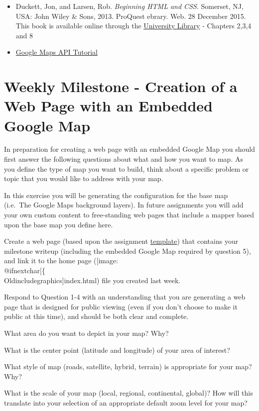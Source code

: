 \documentclass[]{book}
\makeatletter
\providecommand{\tightlist}{%
  \setlength{\itemsep}{0pt}\setlength{\parskip}{0pt}}
\def\ScaleIfNeeded{%
  \ifdim\Gin@nat@width>.5\linewidth
    .5\linewidth
  \else
    \Gin@nat@width
  \fi
}
\let\Oldincludegraphics\texttt{[image: \%
 \\catcode`\\@=11\\relax\%
 \%\\gdef\\includegraphics\{\\@ifnextchar[\{\\Oldincludegraphics]}{\Oldincludegraphics[width=\ScaleIfNeeded]}}%
\gdef\texttt{[image: \\@ifnextchar[\{\\Oldincludegraphics]}{\Oldincludegraphics[max size={.75\textwidth}{.75\textheight}]}}%
\makeatother
\begin{document}
\begin{itemize}
\item
  Duckett, Jon, and Larsen, Rob. \emph{Beginning HTML and CSS}.
  Somerset, NJ, USA: John Wiley \& Sons, 2013. ProQuest ebrary. Web. 28
  December 2015. This book is available online through the
  \href{http://site.ebrary.com.libproxy.unm.edu/lib/unma/detail.action?docID=10667426}{University
  Library} - Chapters 2,3,4 and 8
\item
  \href{http://code.google.com/apis/maps/documentation/javascript/tutorial.html}{Google
  Maps API Tutorial}
\end{itemize}

\section{Weekly Milestone - Creation of a Web Page with an Embedded
Google Map}\label{week03-milestone}

In preparation for creating a web page with an embedded Google Map you
should first answer the following questions about what and how you want
to map. As you define the type of map you want to build, think about a
specific problem or topic that you would like to address with your map.

In this exercise you will be generating the configuration for the base
map (i.e.~The Google Maps background layers). In future assignments you
will add your own custom content to free-standing web pages that include
a mapper based upon the base map you define here.

Create a web page (based upon the assignment
\href{https://github.com/UNM-GEOG-485-585/class-materials/blob/master/sample-files/assignmentTemplate.html}{template})
that contains your milestone writeup (including the embedded Google Map
required by question 5), and link it to the home page
(\texttt{index.html}) file you created last week.

Respond to Question 1-4 with an understanding that you are generating a
web page that is designed for public viewing (even if you don't choose
to make it public at this time), and should be both clear and complete.

\begin{description}
\tightlist
\item[Question 1]
What area do you want to depict in your map? Why?
\item[Question 2]
What is the center point (latitude and longitude) of your area of
interest?
\item[Question 3]
What style of map (roads, satellite, hybrid, terrain) is appropriate for
your map? Why?
\item[Question 4]
What is the scale of your map (local, regional, continental, global)?
How will this translate into your selection of an appropriate default
zoom level for your map?
\end{description}
\end{document}
